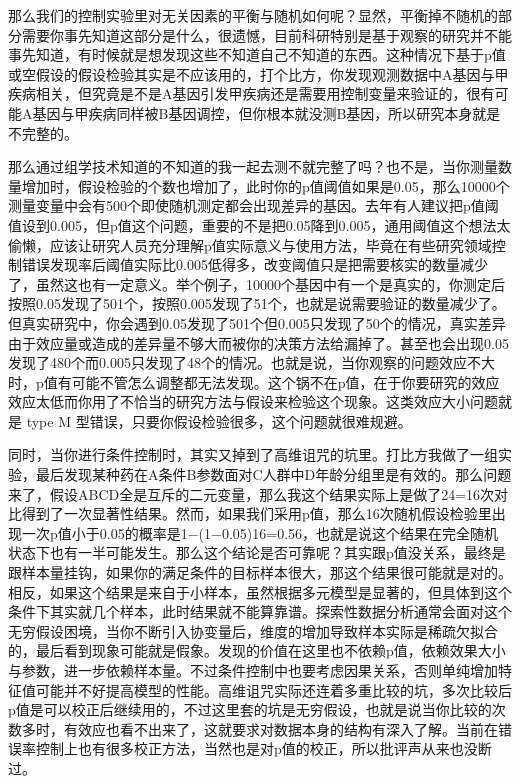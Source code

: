 \documentclass[]{book}
\begin{document}
那么我们的控制实验里对无关因素的平衡与随机如何呢？显然，平衡掉不随机的部分需要你事先知道这部分是什么，很遗憾，目前科研特别是基于观察的研究并不能事先知道，有时候就是想发现这些不知道自己不知道的东西。这种情况下基于p值或空假设的假设检验其实是不应该用的，打个比方，你发现观测数据中A基因与甲疾病相关，但究竟是不是A基因引发甲疾病还是需要用控制变量来验证的，很有可能A基因与甲疾病同样被B基因调控，但你根本就没测B基因，所以研究本身就是不完整的。

那么通过组学技术知道的不知道的我一起去测不就完整了吗？也不是，当你测量数量增加时，假设检验的个数也增加了，此时你的p值阈值如果是0.05，那么10000个测量变量中会有500个即使随机测定都会出现差异的基因。去年有人建议把p值阈值设到0.005，但p值这个问题，重要的不是把0.05降到0.005，通用阈值这个想法太偷懒，应该让研究人员充分理解p值实际意义与使用方法，毕竟在有些研究领域控制错误发现率后阈值实际比0.005低得多，改变阈值只是把需要核实的数量减少了，虽然这也有一定意义。举个例子，10000个基因中有一个是真实的，你测定后按照0.05发现了501个，按照0.005发现了51个，也就是说需要验证的数量减少了。但真实研究中，你会遇到0.05发现了501个但0.005只发现了50个的情况，真实差异由于效应量或造成的差异量不够大而被你的决策方法给漏掉了。甚至也会出现0.05发现了480个而0.005只发现了48个的情况。也就是说，当你观察的问题效应不大时，p值有可能不管怎么调整都无法发现。这个锅不在p值，在于你要研究的效应效应太低而你用了不恰当的研究方法与假设来检验这个现象。这类效应大小问题就是 type M 型错误，只要你假设检验很多，这个问题就很难规避。

同时，当你进行条件控制时，其实又掉到了高维诅咒的坑里。打比方我做了一组实验，最后发现某种药在A条件B参数面对C人群中D年龄分组里是有效的。那么问题来了，假设ABCD全是互斥的二元变量，那么我这个结果实际上是做了24=16次对比得到了一次显著性结果。然而，如果我们采用p值，那么16次随机假设检验里出现一次p值小于0.05的概率是1−(1−0.05)16=0.56，也就是说这个结果在完全随机状态下也有一半可能发生。那么这个结论是否可靠呢？其实跟p值没关系，最终是跟样本量挂钩，如果你的满足条件的目标样本很大，那这个结果很可能就是对的。相反，如果这个结果是来自于小样本，虽然根据多元模型是显著的，但具体到这个条件下其实就几个样本，此时结果就不能算靠谱。探索性数据分析通常会面对这个无穷假设困境，当你不断引入协变量后，维度的增加导致样本实际是稀疏欠拟合的，最后看到现象可能就是假象。发现的价值在这里也不依赖p值，依赖效果大小与参数，进一步依赖样本量。不过条件控制中也要考虑因果关系，否则单纯增加特征值可能并不好提高模型的性能。高维诅咒实际还连着多重比较的坑，多次比较后p值是可以校正后继续用的，不过这里套的坑是无穷假设，也就是说当你比较的次数多时，有效应也看不出来了，这就要求对数据本身的结构有深入了解。当前在错误率控制上也有很多校正方法，当然也是对p值的校正，所以批评声从来也没断过。
\end{document}
